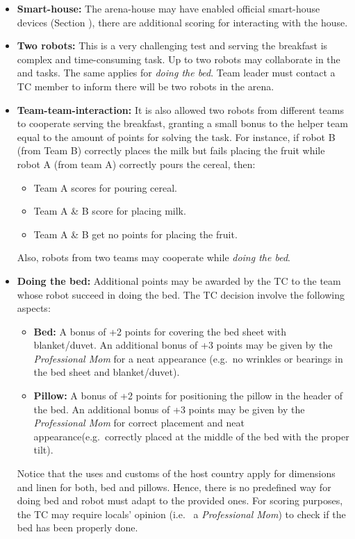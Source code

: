 \begin{itemize}
	\item \textbf{Smart-house:} The arena-house may have enabled official smart-house devices (Section ), there are additional scoring for interacting with the house.

	\item \textbf{Two robots:} This is a very challenging test and serving the breakfast is complex and time-consuming task. Up to two robots may collaborate in the  and  tasks. The same applies for \textit{doing the bed}. Team leader must contact a TC member to inform there will be two robots in the arena.

	\item \textbf{Team-team-interaction:} It is also allowed two robots from different teams to cooperate serving the breakfast, granting a small bonus to the helper team equal to the amount of points for solving the task. For instance, if robot B (from Team B) correctly places the milk but fails placing the fruit while robot A (from team A) correctly pours the cereal, then:
	\begin{itemize}
		\item Team A scores for pouring cereal.
		\item Team A \& B score for placing milk.
		\item Team A \& B get no points for placing the fruit.
	\end{itemize}
	Also, robots from two teams may cooperate while \textit{doing the bed}.

	\item \textbf{Doing the bed:} Additional points may be awarded by the TC to the team whose robot succeed in doing the bed. The TC decision involve the following aspects:
	\begin{itemize}
		\item \textbf{Bed:} A bonus of +2 points for covering the bed sheet with blanket/duvet. An additional bonus of +3 points may be given by the \textit{Professional Mom} for a neat appearance (e.g.~no wrinkles or bearings in the bed sheet and blanket/duvet).
		\item \textbf{Pillow:} A bonus of +2 points for positioning the pillow in the header of the bed. An additional bonus of +3 points may be given by the \textit{Professional Mom} for correct placement and neat appearance(e.g.~correctly placed at the middle of the bed with the proper tilt).
	\end{itemize}
	Notice that the uses and customs of the host country apply for dimensions and linen for both, bed and pillows. Hence, there is no predefined way for doing bed and robot must adapt to the provided ones. For scoring purposes, the TC may require locals' opinion (i.e.~ a \textit{Professional Mom}) to check if the bed has been properly done.
\end{itemize}

